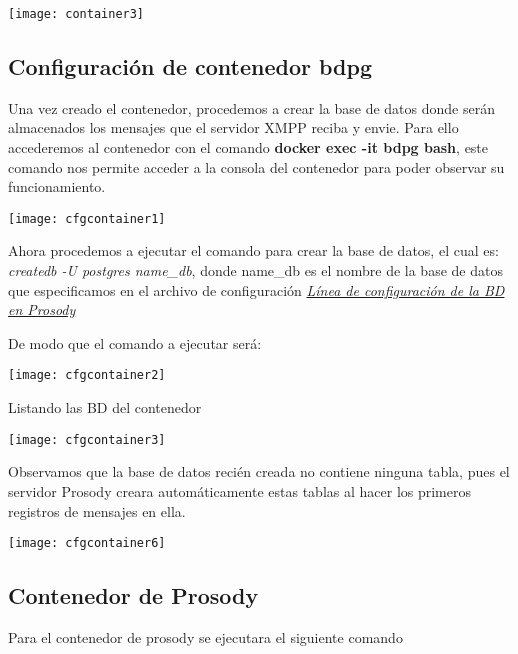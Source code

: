 \documentclass[10pt,letterpaper]{article}
\begin{document}
\begin{center}
\texttt{[image: container3]}
\end{center}

\subsection{Configuración de contenedor bdpg}

Una vez creado el contenedor, procedemos a crear la base de datos donde serán almacenados los mensajes que el servidor XMPP reciba y envie. Para ello accederemos al contenedor con el comando \textbf{docker exec -it bdpg bash}, este comando nos permite acceder a la consola del contenedor para poder observar su funcionamiento.

\begin{center}
\texttt{[image: cfgcontainer1]}
\end{center}

Ahora procedemos a ejecutar el comando para crear la base de datos, el cual es: \textit{createdb -U postgres name\_db}, donde name\_db es el nombre de la base de datos que especificamos en el archivo de configuración \textit{\hyperref[configdb]{Línea de configuración de la BD en Prosody}}

De modo que el comando a ejecutar será:

\begin{center}
\texttt{[image: cfgcontainer2]}
\end{center}

Listando las BD del contenedor

\begin{center}
\texttt{[image: cfgcontainer3]}
\end{center}

Observamos que la base de datos recién creada no contiene ninguna tabla, pues el servidor Prosody creara automáticamente estas tablas al hacer los primeros registros de mensajes en ella.

\begin{center}
\texttt{[image: cfgcontainer6]}
\end{center}

\subsection{Contenedor de Prosody}

Para el contenedor de prosody se ejecutara el siguiente comando
\end{document}
